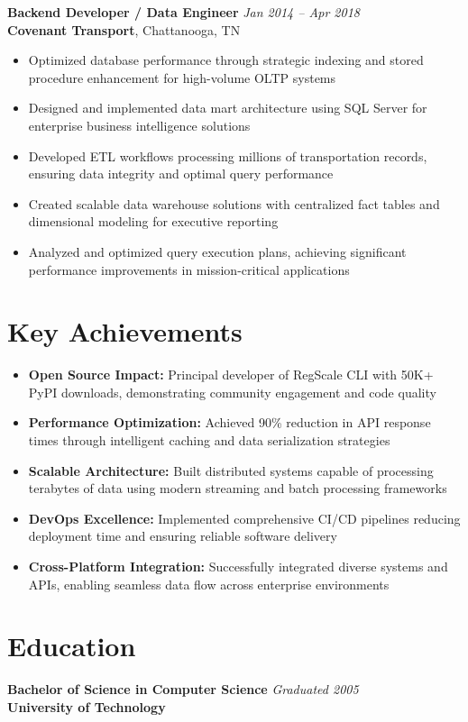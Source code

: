 \documentclass[10pt,letterpaper]{article}
\begin{document}
\vspace{8pt}
\noindent\textbf{Backend Developer / Data Engineer} \hfill \textit{Jan 2014 -- Apr 2018} \\
\textbf{Covenant Transport}, Chattanooga, TN

\begin{itemize}
    \item Optimized database performance through strategic indexing and stored procedure enhancement for high-volume OLTP systems
    \item Designed and implemented data mart architecture using SQL Server for enterprise business intelligence solutions
    \item Developed ETL workflows processing millions of transportation records, ensuring data integrity and optimal query performance
    \item Created scalable data warehouse solutions with centralized fact tables and dimensional modeling for executive reporting
    \item Analyzed and optimized query execution plans, achieving significant performance improvements in mission-critical applications
\end{itemize}

\section{Key Achievements}
\begin{itemize}
    \item \textbf{Open Source Impact:} Principal developer of RegScale CLI with 50K+ PyPI downloads, demonstrating community engagement and code quality
    \item \textbf{Performance Optimization:} Achieved 90\% reduction in API response times through intelligent caching and data serialization strategies
    \item \textbf{Scalable Architecture:} Built distributed systems capable of processing terabytes of data using modern streaming and batch processing frameworks
    \item \textbf{DevOps Excellence:} Implemented comprehensive CI/CD pipelines reducing deployment time and ensuring reliable software delivery
    \item \textbf{Cross-Platform Integration:} Successfully integrated diverse systems and APIs, enabling seamless data flow across enterprise environments
\end{itemize}

\section{Education}
\noindent\textbf{Bachelor of Science in Computer Science} \hfill \textit{Graduated 2005} \\
\textbf{University of Technology}
\end{document}
